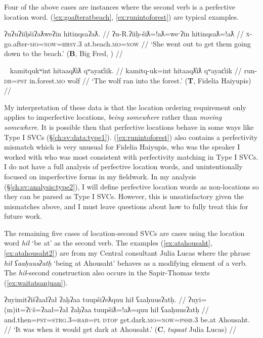 Four of the above cases are instances where the second verb is a perfective location word. (\ref{ex:goafteratbeach}, \ref{ex:runintoforest}) are typical examples.

\ex \label{ex:goafteratbeach}
\begingl
\glpreamble ʔuʔuʔiiḥšiʔaƛweʔin hitinqsaʔaƛ. //
\gla ʔu-R.ʔiiḥ-šiƛ=!aƛ=weˑʔin hitinqsaƛ=!aƛ  //
\glb \textsc{x}-go.after-\textsc{mo}=\textsc{now}=\textsc{hrsy.3} at.beach.\textsc{mo}=\textsc{now} //
\glft `She went out to get them going down to the beach.' (\textbf{B}, Big Fred, \citealt[p.~54]{sapir1939}) //
\endgl
\xe

\ex~ \label{ex:runintoforest}
\begingl
\glpreamble kamitqukʷint hitaaqƛ̓iƛ qʷayac̓iik. //
\gla kamitq-uk=int hitaaqƛ̓iƛ qʷayac̓iik  //
\glb run-\textsc{dr}=\textsc{pst} in.forest.\textsc{mo} wolf //
\glft `The wolf ran into the forest.' (\textbf{T}, Fidelia Haiyupis) //
\endgl
\xe

My interpretation of these data is that the location ordering requirement only applies to imperfective locations, \textit{being somewhere} rather than \textit{moving somewhere}. It is possible then that perfective locations behave in some ways like Type I SVCs (\S\ref{ch:sv:data:type1}). (\ref{ex:runintoforest}) also contains a perfectivity mismatch which is very unusual for Fidelia Haiyupis, who was the speaker I worked with who was most consistent with perfectivity matching in Type I SVCs. I do not have a full analysis of perfective location words, and unintentionally focused on imperfective forms in my fieldwork. In my analysis (\S\ref{ch:sv:analysis:type2}), I will define perfective location words as non-locations so they can be parsed as Type I SVCs. However, this is unsatisfactory given the mismatches above, and I must leave questions about how to fully treat this for future work.

The remaining five cases of location-second SVCs are cases using the location word \textit{hił} `be at' as the second verb. The examples (\ref{ex:atahousaht}, \ref{ex:atahousaht2}) are from my Central consultant Julia Lucas where the phrase \textit{hił ʕaaḥuusʔatḥ} `being at Ahousaht' behaves as a modifying element of a verb. The \textit{hił}-second construction also occurs in the Sapir-Thomas texts (\ref{ex:waitatsanjuan}).

\ex \label{ex:atahousaht}
\begingl
\glpreamble ʔuyimitʔišʔaałʔał ʔaḥʔaa tuupšiʔeƛquu hił ʕaaḥuusʔatḥ. //
\gla ʔuyi=(m)it=ʔiˑš=ʔaał=ʔał ʔaḥʔaa tuupšiƛ=!aƛ=quu hił ʕaaḥuusʔatḥ  //
\glb and.then=\textsc{pst}=\textsc{strg.3}=\textsc{hab}=\textsc{pl} \textsc{dtop} get.dark.\textsc{mo}=\textsc{now}=\textsc{pssb.3} be.at Ahousaht. //
\glft `It was when it would get dark at Ahousaht.' (\textbf{C}, \textit{tupaat} Julia Lucas) //
\endgl
\xe

